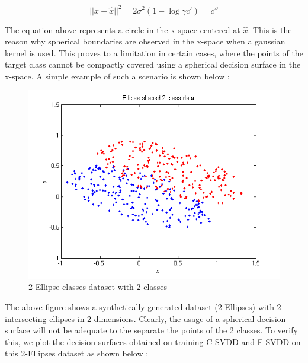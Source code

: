\documentclass{article} %
\begin{document}
\[ || x - \hat{x}||^2 = 2 \sigma^2 (1 - \log{\gamma c'}) = c''\] 

The equation above represents a circle in the x-space centered at $\hat{x}$. This is the reason why spherical boundaries are observed in the x-space when a gaussian kernel is used. This proves to a limitation in certain cases, where the points of the target class cannot be compactly covered using a spherical decision surface in the x-space. A simple example of such a scenario is shown below :


\begin{figure}[H]
  \centering
  \includegraphics[width=\linewidth]{../Code/Ellipse/svdd/data}
  \caption{2-Ellipse classes dataset with 2 classes}
\end{figure}



The above figure shows a synthetically generated dataset (2-Ellipses) with 2 intersecting ellipses in 2 dimensions.  Clearly, the usage of a spherical decision surface will not be adequate to the separate the points of the 2 classes. To verify this, we plot the decision surfaces obtained on training C-SVDD and F-SVDD on this 2-Ellipses dataset as shown below :
\end{document}
